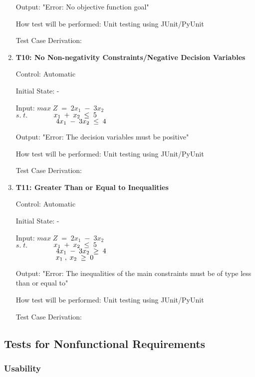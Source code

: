 \documentclass[12pt, titlepage]{article}
\begin{document}
\begin{enumerate}
	Output: "Error: No objective function goal"
	
	How test will be performed: Unit testing using JUnit/PyUnit
	
	Test Case Derivation: 
	
	\item{\textbf{T10: No Non-negativity Constraints/Negative Decision 
	Variables}}
	
	Control: Automatic
	
	Initial State: -
	
	Input: $max\;Z\;=\;2x_1\;-\;3x_2$\\
	$s.\;t.$$\hspace*{1.3cm} x_1\;+\;x_2\; \leq \;5$\\
	$\hspace*{2cm} 4x_1\;-\;3x_2\; \leq \;4$
	
	Output: "Error: The decision variables must be positive"
	
	How test will be performed: Unit testing using JUnit/PyUnit
	
	Test Case Derivation: 
	
	\item{\textbf{T11: Greater Than or Equal to Inequalities}}
	
	Control: Automatic
	
	Initial State: -
	
	Input: $max\;Z\;=\;2x_1\;-\;3x_2$\\
	$s.\;t.$$\hspace*{1.3cm} x_1\;+\;x_2\; \leq \;5$\\
	$\hspace*{2cm} 4x_1\;-\;3x_2\; \geq \;4$\\
	$\hspace*{2cm} x_1\;,\;x_2\; \geq \;0$
	
	Output: "Error: The inequalities of the main constraints must be of type 
	less than or equal to"
	
	How test will be performed: Unit testing using JUnit/PyUnit
	
	Test Case Derivation: 
\end{enumerate}

\subsection{Tests for Nonfunctional Requirements}

\subsubsection{Usability}
\end{document}
